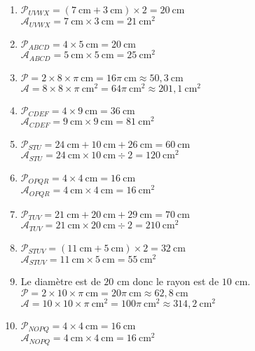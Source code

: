 \documentclass[a4paper,11pt,fleqn]{article}
\begin{document}
\begin{correction}
\begin{multicols}{2}
\begin{enumerate}
	\item $\mathcal{P}_{UVWX}=(7~\text{cm}+3~\text{cm})\times2=20~\text{cm}$\\
$\mathcal{A}_{UVWX}=7~\text{cm}\times3~\text{cm}=21~\text{cm}^2$
	\item $\mathcal{P}_{ABCD}=4\times5~\text{cm}=20~\text{cm}$\\
$\mathcal{A}_{ABCD}=5~\text{cm}\times5~\text{cm}=25~\text{cm}^2$
	\item $\mathcal{P}=2\times8\times\pi~\text{cm}=16\pi~\text{cm}\approx50,3~\text{cm}$\\
$\mathcal{A}=8\times8\times\pi~\text{cm}^2=64\pi~\text{cm}^2\approx201,1~\text{cm}^2$
	\item $\mathcal{P}_{CDEF}=4\times9~\text{cm}=36~\text{cm}$\\
$\mathcal{A}_{CDEF}=9~\text{cm}\times9~\text{cm}=81~\text{cm}^2$
	\item $\mathcal{P}_{STU}=24~\text{cm}+10~\text{cm}+26~\text{cm}=60~\text{cm}$\\
$\mathcal{A}_{STU}=24~\text{cm}\times10~\text{cm}\div2=120~\text{cm}^2$
	\item $\mathcal{P}_{OPQR}=4\times4~\text{cm}=16~\text{cm}$\\
$\mathcal{A}_{OPQR}=4~\text{cm}\times4~\text{cm}=16~\text{cm}^2$
	\item $\mathcal{P}_{TUV}=21~\text{cm}+20~\text{cm}+29~\text{cm}=70~\text{cm}$\\
$\mathcal{A}_{TUV}=21~\text{cm}\times20~\text{cm}\div2=210~\text{cm}^2$
	\item $\mathcal{P}_{STUV}=(11~\text{cm}+5~\text{cm})\times2=32~\text{cm}$\\
$\mathcal{A}_{STUV}=11~\text{cm}\times5~\text{cm}=55~\text{cm}^2$
	\item Le diamètre est de $20$ cm donc le rayon est de $10$ cm.\\
$\mathcal{P}=2\times10\times\pi~\text{cm}=20\pi~\text{cm}\approx62,8~\text{cm}$\\
$\mathcal{A}=10\times10\times\pi~\text{cm}^2=100\pi~\text{cm}^2\approx314,2~\text{cm}^2$
	\item $\mathcal{P}_{NOPQ}=4\times4~\text{cm}=16~\text{cm}$\\
$\mathcal{A}_{NOPQ}=4~\text{cm}\times4~\text{cm}=16~\text{cm}^2$
\end{enumerate}
\end{multicols}


\end{correction}
\end{document}
